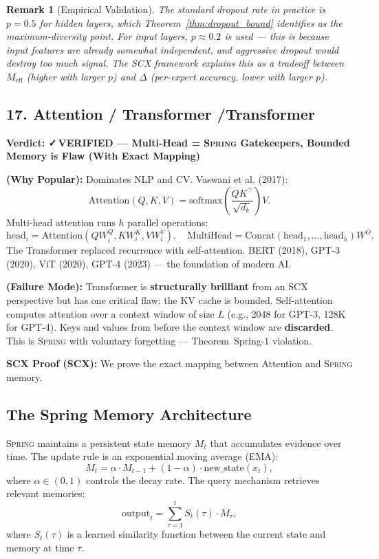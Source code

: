 \documentclass[12pt,a4paper]{article}
\newtheorem{remark}[theorem]{Remark}
\theoremstyle{definition}
\newcommand{\verified}{{\color{verifiedcolor}\textbf{✓\,VERIFIED}}}
\newcommand{\Spring}{\textsc{Spring}}
\newcommand{\SCX}{\textsc{SCX}}
\newcommand{\auditHeader}[1]{\medskip\noindent\textbf{\large #1}\medskip}
\newcommand{\whyPopular}{\noindent\textbf{ (Why Popular):} }
\newcommand{\whyFail}{\noindent\textbf{ (Failure Mode):} }
\newcommand{\scxProof}{\noindent\textbf{SCX Proof (SCX):} }
\begin{document}
\begin{remark}[Empirical Validation]
The standard dropout rate in practice is $p = 0.5$ for hidden layers, which Theorem~\ref{thm:dropout_bound} identifies as the maximum-diversity point. For input layers, $p \approx 0.2$ is used — this is because input features are already somewhat independent, and aggressive dropout would destroy too much signal. The \SCX{} framework explains this as a tradeoff between $M_{\text{eff}}$ (higher with larger $p$) and $\Delta$ (per-expert accuracy, lower with larger $p$).
\end{remark}

\subsection{17. Attention / Transformer /Transformer}

\auditHeader{Verdict: \verified{} — Multi-Head = \Spring{} Gatekeepers, Bounded Memory is Flaw (With Exact Mapping)}

\whyPopular{} Dominates NLP and CV. Vaswani et al. (2017):
\[
\text{Attention}(Q, K, V) = \text{softmax}\left(\frac{QK^\top}{\sqrt{d_k}}\right)V.
\]
Multi-head attention runs $h$ parallel operations:
\[
\text{head}_i = \text{Attention}(QW_i^Q, KW_i^K, VW_i^V), \quad \text{MultiHead} = \text{Concat}(\text{head}_1, \ldots, \text{head}_h)W^O.
\]
The Transformer replaced recurrence with self-attention. BERT (2018), GPT-3 (2020), ViT (2020), GPT-4 (2023) — the foundation of modern AI.

\whyFail{} Transformer is \textbf{structurally brilliant} from an \SCX{} perspective but has one critical flaw: the KV cache is bounded. Self-attention computes attention over a context window of size $L$ (e.g., 2048 for GPT-3, 128K for GPT-4). Keys and values from before the context window are \textbf{discarded}. This is \Spring{} with voluntary forgetting — Theorem~Spring-1 violation.

\scxProof{} We prove the exact mapping between Attention and \Spring{} memory.

\subsection*{The Spring Memory Architecture}

\Spring{} maintains a persistent state memory $M_t$ that accumulates evidence over time. The update rule is an exponential moving average (EMA):
\begin{equation}\label{eq:spring_update}
    M_{t} = \alpha \cdot M_{t-1} + (1-\alpha) \cdot \text{new\_state}(x_t),
\end{equation}
where $\alpha \in (0,1)$ controls the decay rate. The query mechanism retrieves relevant memories:
\begin{equation}\label{eq:spring_query}
    \text{output}_t = \sum_{\tau=1}^{t} S_t(\tau) \cdot M_\tau,
\end{equation}
where $S_t(\tau)$ is a learned similarity function between the current state and memory at time $\tau$.
\end{document}
